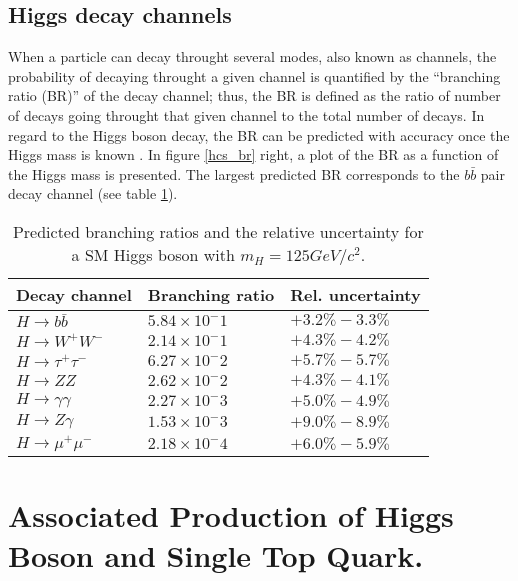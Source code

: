 \subsection{Higgs decay channels}\label{sec:decays}

\noindent When a particle can decay throught several modes, also known as channels, the probability of decaying throught a given channel is quantified by the ``branching ratio (BR)'' of the decay channel; thus, the BR is defined as the ratio of number of decays going throught that given channel to the total number of decays. In regard to the Higgs boson decay, the BR can be predicted with accuracy once the Higgs mass is known \cite{riley, denner}. In figure \ref{hcs_br} right, a plot of the BR as a function of the Higgs mass is presented. The largest predicted BR corresponds to the $b\bar{b}$ pair decay channel (see table \ref{hdbr}). %

\begin{center}
\begin{table}[h]
\centering
\begin{tabular}{lll}\hline
Decay channel       & Branching ratio   & Rel. uncertainty\\\hline
$H\to b\bar{b}$     & $5.84\times10^-1$ & $+3.2\%-3.3\%$\\
$H\to W^+W^-$       & $2.14\times10^-1$ & $+4.3\%-4.2\%$\\
$H\to\tau^+\tau^-$  & $6.27\times10^-2$ & $+5.7\%-5.7\%$\\
$H\to ZZ$           & $2.62\times10^-2$ & $+4.3\%-4.1\%$\\
$H\to \gamma\gamma$ & $2.27\times10^-3$ & $+5.0\%-4.9\%$\\
$H\to Z\gamma$      & $1.53\times10^-3$ & $+9.0\%-8.9\%$\\
$H\to\mu^+\mu^-$    & $2.18\times10^-4$ & $+6.0\%-5.9\%$\\\hline
\end{tabular}
\caption[Predicted branching ratios for a SM Higgs boson with $m_H = 125$ GeV/c$^2$.]{Predicted branching ratios and the relative uncertainty for a SM Higgs boson with $m_H = 125GeV/c^2$.\cite{pdg}}\label{hdbr}
\end{table}
\end{center}
\section{Associated Production of Higgs Boson and Single Top Quark.}\label{sec:thq}

